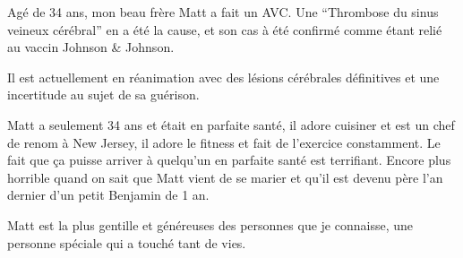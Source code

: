 Agé de 34 ans, mon beau frère Matt a fait un AVC. Une “Thrombose du sinus
veineux cérébral” en a été la cause, et son cas à été confirmé comme étant relié
au vaccin Johnson \& Johnson.

Il est actuellement en réanimation avec des lésions cérébrales définitives et
une incertitude au sujet de sa guérison.

Matt a seulement 34 ans et était en parfaite santé, il adore cuisiner et est un
chef de renom à New Jersey, il adore le fitness et fait de l'exercice
constamment. Le fait que ça puisse arriver à quelqu'un en parfaite santé est
terrifiant. Encore plus horrible quand on sait que Matt vient de se marier et
qu'il est devenu père l'an dernier d'un petit Benjamin de 1 an.

Matt est la plus gentille et généreuses des personnes que je connaisse, une
personne spéciale qui a touché tant de vies.

